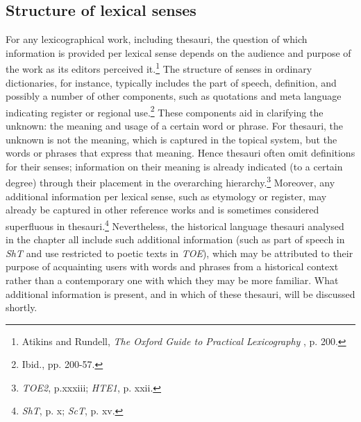 \subsection{Structure of lexical senses}
For any lexicographical work, including thesauri, the question of which information is provided per lexical sense depends on the audience and purpose of the work as its editors perceived it.\footnote{%
Atikins and Rundell, \textit{The Oxford Guide to Practical Lexicography}%
, p. 200.} The structure of senses in ordinary dictionaries, for instance, typically includes the part of speech, definition, and possibly a number of other components, such as quotations and meta language indicating register or regional use.\footnote{%
Ibid., pp. 200-57.} These components aid in clarifying the unknown: the meaning and usage of a certain word or phrase. For thesauri, the unknown is not the meaning, which is captured in the topical system, but the words or phrases that express that meaning. Hence thesauri often omit definitions for their senses; information on their meaning is already indicated (to a certain degree) through their placement in the overarching hierarchy.\footnote{\textit{TOE2}, p.xxxiii; \textit{HTE1}, p. xxii.} Moreover, any additional information per lexical sense, such as etymology or register, may already be captured in other reference works and is sometimes considered superfluous in thesauri.\footnote{\textit{ShT}, p. x; \textit{ScT}, p. xv.} 
Nevertheless, the historical language thesauri analysed in the chapter all include such additional information (such as part of speech in \textit{ShT} and use restricted to poetic texts in \textit{TOE}), which may be attributed to their purpose of acquainting users with words and phrases from a historical context rather than a contemporary one with which they may be more familiar. What additional information is present, and in which of these thesauri, will be discussed shortly.

